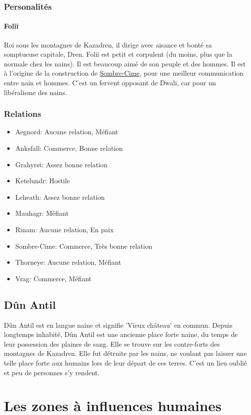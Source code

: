 \subsubsection{Personalités}
\paragraph{Folii}
\hypertarget {folii}{}Roi sous les montagnes de Kazadren, il dirige avec aisance et bonté sa somptueuse capitale, Dren.
Folii est petit et corpulent (du moins, plus que la normale chez les nains).
Il est beaucoup aimé de son peuple et des hommes. Il est à l'origine de la construction de \hyperlink {sombrecime}{Sombre-Cime}, pour une meilleur communication entre nain et hommes. 
C'est un fervent opposant de Dwali, car pour un libéralisme des nains.
\subsubsection{Relations}
\begin{itemize}
\item Aegnord: Aucune relation, Méfiant 
\item Anksfall: Commerce, Bonne relation 
\item Grahyrst: Assez bonne relation 
\item Ketelundr: Hostile 
\item Leheath: Assez bonne relation
\item Mauhagr: Méfiant 
\item Rinam: Aucune relation, En paix
\item Sombre-Cime: Commerce, Très bonne relation 
\item Thorneye: Aucune relation, Méfiant 
\item Vrag: Commerce, Méfiant 
\end{itemize}
\subsection{Dûn Antil}
Dûn Antil est en langue naine et signifie ’Vieux château’ en commun. Depuis longtemps inhabité, Dûn Antil est une ancienne place forte naine, du temps de leur possession des plaines de sang. Elle se trouve sur les contre-forts des montagnes de Kazadren. Elle fut détruite par les nains, ne voulant pas laisser une telle place forte aux humains lors de leur départ de ces terres. C’est un lieu oublié et peu de personnes s’y rendent. 
\section{Les zones à influences humaines}
